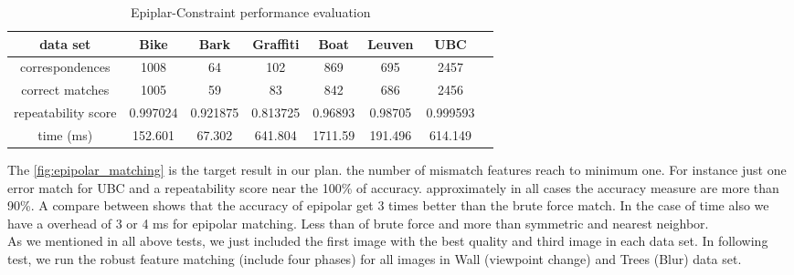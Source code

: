 \begin{table}[H]
  \begin{tabular}{| c || c | c | c | c | c | c | c |}
      \hline
      data set & Bike & Bark & Graffiti & Boat & Leuven & UBC \\ \hline \hline
      correspondences & 1008 & 64 & 102 & 869 & 695 & 2457 \\ \hline
      correct matches & 1005 & 59 & 83 & 842 & 686 & 2456 \\ \hline
      repeatability score & 0.997024 & 0.921875 & 0.813725 & 0.96893 & 0.98705 & 0.999593 \\ \hline
      time (ms) & 152.601 & 67.302 & 641.804 & 1711.59 & 191.496 & 614.149 \\ \hline
  \end{tabular}
  \caption{Epiplar-Constraint performance evaluation} \label{tab:epipolar_matching_eval}
\end{table}

The \autoref{fig:epipolar_matching} is the target result in our plan. the number of mismatch features reach to minimum one. For instance just one error match for UBC and a repeatability score near the 100\% of accuracy. approximately in all cases the accuracy measure are more than 90\%. A compare between shows that the accuracy of epipolar get 3 times better than the brute force match. In the case of time also we have a overhead of 3 or 4 ms for epipolar matching. Less than of brute force and more than symmetric and nearest neighbor.\\
As we mentioned in all above tests, we just included the first image with the best quality and third image in each data set.
In following test, we run the robust feature matching (include four phases) for all images in Wall (viewpoint change) and Trees (Blur) data set.

